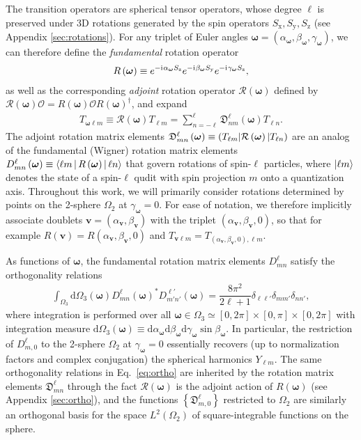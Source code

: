 \documentclass[nofootinbib,notitlepage,twocolumn]{revtex4-2}
\newcommand{\f}[2]{\dfrac{#1}{#2}} %
\newcommand{\p}[1]{\left(#1\right)} %
\renewcommand{\set}[1]{\left\{#1\right\}} %
\newcommand{\bk}{\Braket} %
\renewcommand{\v}{\bm} %
\renewcommand{\i}{\mathrm{i}\mkern1mu} %
\newcommand{\1}{\mathds{1}}
\newcommand{\x}{\text{x}}
\newcommand{\y}{\text{y}}
\newcommand{\z}{\text{z}}
\renewcommand{\O}{\mathcal{O}}
\newcommand{\R}{\mathcal{R}}
\newcommand{\D}{\mathfrak{D}}
\renewcommand{\d}{\text{d}}
\def\obk#1{\mathinner{({#1})}}
\begin{document}
The transition operators are spherical tensor operators, whose degree $\ell$ is preserved under 3D rotations generated by the spin operators $S_\x,S_\y,S_\z$ (see Appendix \ref{sec:rotations}).
For any triplet of Euler angles $\v\omega=\p{\alpha_{\v\omega},\beta_{\v\omega},\gamma_{\v\omega}}$, we can therefore define the {\it fundamental} rotation operator
\begin{align}
  R\p{\v\omega} \equiv e^{-\i\alpha_{\v\omega}S_\z} e^{-\i\beta_{\v\omega}S_\y} e^{-\i\gamma_{\v\omega}S_\z},
  \label{eq:rot_op}
\end{align}
as well as the corresponding {\it adjoint} rotation operator $\R\p{\v\omega}$ defined by $\R\p{\v\omega}\O = R\p{\v\omega} \O R\p{\v\omega}^\dag$, and expand
\begin{align}
  T_{\v\omega\ell m} \equiv
  \R\p{\v\omega} T_{\ell m}
  = \sum_{n=-\ell}^\ell \D_{nm}^\ell\p{\v\omega} T_{\ell n}.
  \label{eq:trans_rot}
\end{align}
The adjoint rotation matrix elements $\D_{mn}^\ell\p{\v\omega}\equiv\obk{T_{\ell m}|\R\p{\v\omega}|T_{\ell n}}$ are an analog of the fundamental (Wigner) rotation matrix elements $D_{mn}^\ell\p{\v\omega}\equiv\bk{\ell m|R\p{\v\omega}|\ell n}$ that govern rotations of spin-$\ell$ particles, where $\ket{\ell m}$ denotes the state of a spin-$\ell$ qudit with spin projection $m$ onto a quantization axis.
Throughout this work, we will primarily consider rotations determined by points on the 2-sphere $\Omega_2$ at $\gamma_{\v\omega}=0$.
For ease of notation, we therefore implicitly associate doublets $\v v=\p{\alpha_{\v v},\beta_{\v v}}$ with the triplet $\p{\alpha_{\v v},\beta_{\v v},0}$, so that for example $R\p{\v v} = R\p{\alpha_{\v v},\beta_{\v v},0}$ and $T_{\v v\ell m} = T_{\p{\alpha_{\v v},\beta_{\v v},0},\ell m}$.

As functions of $\v\omega$, the fundamental rotation matrix elements $D_{mn}^\ell$ satisfy the orthogonality relations \cite{brown2003rotational}
\begin{align}
  \int_{\Omega_3} \d\Omega_3\p{\v\omega}
  D^{\ell}_{mn}\p{\v\omega}^* D^{\ell'}_{m'n'}\p{\v\omega}
  = \f{8\pi^2}{2\ell+1} \delta_{\ell\ell'} \delta_{mm'} \delta_{nn'},
  \label{eq:ortho}
\end{align}
where integration is performed over all $\v\omega\in\Omega_3\simeq[0,2\pi]\times[0,\pi]\times[0,2\pi]$ with integration measure $\d\Omega_3\p{\v\omega} \equiv \d\alpha_{\v\omega} \d\beta_{\v\omega} \d\gamma_{\v\omega} \sin\beta_{\v\omega}$.
In particular, the restriction of $D^\ell_{m,0}$ to the 2-sphere $\Omega_2$ at $\gamma_{\v\omega}=0$ essentially recovers (up to normalization factors and complex conjugation) the spherical harmonics $Y_{\ell m}$.
The same orthogonality relations in Eq.~\eqref{eq:ortho} are inherited by the rotation matrix elements $\D_{mn}^\ell$ through the fact $\R\p{\v\omega}$ is the adjoint action of $R\p{\v\omega}$ (see Appendix \ref{sec:ortho}), and the functions $\set{\D_{m,0}^\ell}$ restricted to $\Omega_2$ are similarly an orthogonal basis for the space $L^2\p{\Omega_2}$ of square-integrable functions on the sphere.
\end{document}
